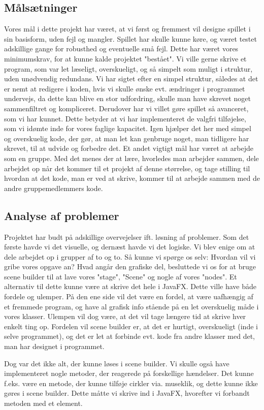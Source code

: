 \subsection{Målsætninger}
Vores mål i dette projekt har været, at vi først og fremmest vil designe spillet i sin basisform, uden fejl og mangler. Spillet har skulle kunne køre, og været testet adskillige gange for robusthed og eventuelle små fejl. Dette har været vores minimumskrav, for at kunne kalde projektet "bestået".
Vi ville gerne skrive et program, som var let læseligt, overskueligt, og så simpelt som muligt i struktur, uden unødvendig redundans. Vi har sigtet efter en simpel struktur, således at det er nemt at redigere i koden, hvis vi skulle ønske evt. ændringer i programmet undervejs, da dette kan blive en stor udfordring, skulle man have skrevet noget sammenfiltret og kompliceret. 
Derudover har vi villet gøre spillet så avanceret, som vi har kunnet. Dette betyder at vi har implementeret de valgfri tilføjelse, som vi idømte inde for vores faglige kapacitet. Igen hjælper det her med simpel og overskuelig kode, der gør, at man let kan genbruge noget, man tidligere har skrevet, til at udvide og forbedre det.  
Et andet vigtigt mål har været at arbejde som en gruppe. Med det menes der at lære, hvorledes man arbejder sammen, dele arbejdet op når det kommer til et projekt af denne størrelse, og tage stilling til hvordan at det kode, man er ved at skrive, kommer til at arbejde sammen med de andre gruppemedlemmers kode. 

\subsection{Analyse af problemer}
Projektet har budt på adskillige overvejelser ift. løsning af problemer. Som det første havde vi det visuelle, og dernæst havde vi det logiske. Vi blev enige om at dele arbejdet op i grupper af to og to. Så kunne vi spørge os selv: Hvordan vil vi gribe vores opgave an? Hvad angår den grafiske del, besluttede vi os for at bruge scene builder til at lave vores "stage", "Scene" og nogle af vores "nodes". Et alternativ til dette kunne være at skrive det hele i JavaFX. Dette ville have både fordele og ulemper. På den ene side vil det være en fordel, at være uafhængig af et fremmede program, og have al grafisk info stående på en let overskuelig måde i vores klasser. Ulempen vil dog være, at det vil tage længere tid at skrive hver enkelt ting op. Fordelen vil scene builder er, at det er hurtigt, overskueligt (inde i selve programmet), og det er let at forbinde evt. kode fra andre klasser med det, man har designet i programmet.

Dog var det ikke alt, der kunne løses i scene builder. Vi skulle også have implementeret nogle metoder, der reagerede på forskellige hændelser. Det kunne f.eks. være en metode, der kunne tilføje cirkler via. museklik, og dette kunne ikke gøres i scene builder. Dette måtte vi skrive ind i JavaFX, hvorefter vi forbandt metoden med et element.
\newline
\newline
